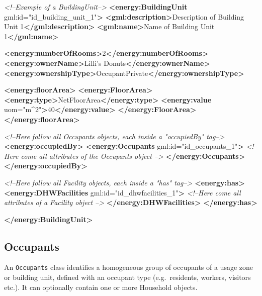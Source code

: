 \documentclass[a4paper,12pt]{article}
\newenvironment{Shaded}{}{}
\newcommand{\KeywordTok}[1]{\textcolor[rgb]{0.00,0.44,0.13}{\textbf{{#1}}}}
\newcommand{\StringTok}[1]{\textcolor[rgb]{0.25,0.44,0.63}{{#1}}}
\newcommand{\CommentTok}[1]{\textcolor[rgb]{0.38,0.63,0.69}{\textit{{#1}}}}
\newcommand{\OtherTok}[1]{\textcolor[rgb]{0.00,0.44,0.13}{{#1}}}
\newcommand{\NormalTok}[1]{{#1}}
\begin{document}
\begin{Shaded}
\begin{Highlighting}[]
\CommentTok{<!--Example of a BuildingUnit-->}
\KeywordTok{<energy:BuildingUnit}\OtherTok{ gml:id=}\StringTok{"id_building_unit_1"}\KeywordTok{>}
    \KeywordTok{<gml:description>}\NormalTok{Description of Building Unit 1}\KeywordTok{</gml:description>}
    \KeywordTok{<gml:name>}\NormalTok{Name of Building Unit 1}\KeywordTok{</gml:name>}

    \KeywordTok{<energy:numberOfRooms>}\NormalTok{2}\KeywordTok{</energy:numberOfRooms>}
    \KeywordTok{<energy:ownerName>}\NormalTok{Lilli's Donuts}\KeywordTok{</energy:ownerName>}
    \KeywordTok{<energy:ownershipType>}\NormalTok{OccupantPrivate}\KeywordTok{</energy:ownershipType>}

    \KeywordTok{<energy:floorArea>}
        \KeywordTok{<energy:FloorArea>}
            \KeywordTok{<energy:type>}\NormalTok{NetFloorArea}\KeywordTok{</energy:type>}
            \KeywordTok{<energy:value}\OtherTok{ uom=}\StringTok{"m^2"}\KeywordTok{>}\NormalTok{40}\KeywordTok{</energy:value>}
        \KeywordTok{</energy:FloorArea>}
    \KeywordTok{</energy:floorArea>}

    \CommentTok{<!--Here follow all Occupants objects, each inside a "occupiedBy" tag-->}
    \KeywordTok{<energy:occupiedBy>}
        \KeywordTok{<energy:Occupants}\OtherTok{ gml:id=}\StringTok{"id_occupants_1"}\KeywordTok{>}
            \CommentTok{<!--Here come all attributes of the Occupants object -->}
        \KeywordTok{</energy:Occupants>}
    \KeywordTok{</energy:occupiedBy>}

    \CommentTok{<!--Here follow all Facility objects, each inside a "has" tag-->}
    \KeywordTok{<energy:has>}
        \KeywordTok{<energy:DHWFacilities}\OtherTok{ gml:id=}\StringTok{"id_dhwfacilities_1"}\KeywordTok{>}
            \CommentTok{<!--Here come all attributes of a Facility object -->}
        \KeywordTok{</energy:DHWFacilities>}
    \KeywordTok{</energy:has>}

\KeywordTok{</energy:BuildingUnit>}
\end{Highlighting}
\end{Shaded}

\subsection{Occupants}\label{occupants}

An \texttt{Occupants} class identifies a homogeneous group of occupants
of a usage zone or building unit, defined with an occupant type
(e.g.~residents, workers, visitors etc.). It can optionally contain one
or more Household objects.
\end{document}
